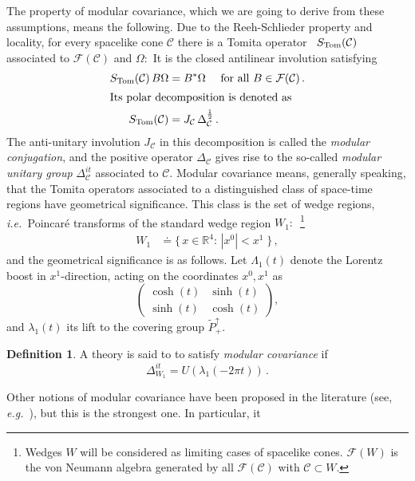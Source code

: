 \documentclass[a4paper,reqno,11pt]{amsart}
\theoremstyle{plain}
\theoremstyle{definition}
\newtheorem{Def}[Thm]{Definition}
\numberwithin{equation}{section}
\newcommand{\Bb}{\mathbb{R}}
\newcommand{\F}{{\mathcal F}}
\newcommand{\calC}{{\mathcal C}}
\newcommand{\Potild}{\tilde{P}_+^{\uparrow}}
\newcommand{\half}{{\frac{1}{2}}}
\newcommand{\unity}{1}
\newcommand{\DWR}{\Delta_{W_1}}  %
\newcommand{\cone}{\calC}   %
\begin{document}
The property of modular covariance, which we are going to derive from
these assumptions, means the following. 
Due to the Reeh-Schlieder property and locality, for every spacelike 
cone $\cone$ there is a Tomita operator~\cite{BraRob} $S_{\rm Tom}(\cone)$ 
associated to  $\F(\cone)$ and $\Omega:$ 
It is the  closed antilinear involution satisfying 
\begin{align*} %
S_{\rm Tom}(\cone)\,B\Omega&=B^*\Omega\quad\mbox{ for all }B\in\F(\cone)\,.\\
\intertext{Its polar decomposition is denoted as }
S_{\rm Tom}(\cone) &= J_{\cone}\,\Delta_{\cone}^{\half}\,.
\end{align*} 
The anti-unitary involution $J_{\cone}$ in this decomposition is called 
the {\em modular conjugation}, and the positive operator $\Delta_{\cone}$ 
gives rise to the so-called {\em modular unitary group} $\Delta_{\cone}^{it}$
associated to $\cone.$ 
Modular covariance means, generally speaking, that the Tomita
operators associated to a distinguished class of space-time regions 
have geometrical significance. This class is the set of wedge
regions, 
{\it i.e.\ }Poincar\'e transforms of the standard wedge region 
$W_1:$~\footnote{Wedges $W$ will be considered as limiting cases of 
spacelike cones. $\F(W)$ is the von Neumann algebra 
generated by all $\F(\cone)$ with $\cone\subset  W.$} 
\begin{align*} 
W_1 &\doteq\{\,x\in\Bb^4:\,|x^0|<x^1\;\}\,, 
\end{align*} 
and the geometrical significance is as follows. 
Let $\Lambda_1(t)$ denote the Lorentz boost in 
$x^1$-direction, acting on the coordinates $x^0,x^1$ as 
\begin{equation*}
\left( \begin{array}{cc}
 \cosh(t) &  \sinh(t)  \\
 \sinh(t) &  \cosh(t)
 \end{array} \right),
\end{equation*} %
and $\lambda_1(t)$ its lift to the covering group $\Potild.$ 
\begin{Def}
A theory is said to to satisfy {\em modular covariance}
if 
\begin{equation} \label{eqModCov}
  \DWR^{it} = U(\lambda_1(-2\pi t))\,. 
\end{equation}
\end{Def}
Other notions of modular covariance have been proposed in the literature 
(see, {\it e.g.}~\cite{Dav}), but this is the strongest one. In particular, it 
\end{document}
